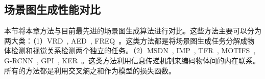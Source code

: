 \begin{table}[htbp]
\begin{center}
\end{center}
\caption{不同多智能体通信步数对性能的影响}
\label{ch4:tab:comm_steps}
\end{table}



\subsection{场景图生成性能对比}
本节将本章方法与目前最先进的场景图生成算法进行对比。这些方法主要可以分为两大类：（1）VRD~\cite{lu2016visual}, AED~\cite{newell2017pixels}, FREQ~\cite{zellers2018neural}。这类方法都是将场景图生成任务分解成物体检测和视觉关系检测两个独立的任务。（2）MSDN~\cite{li2017scene}, IMP~\cite{xu2017scene}, TFR~\cite{jae2018tensorize}, MOTIFS~\cite{zellers2018neural}, G-RCNN~\cite{yang2018graph}, GPI~\cite{herzig2018mapping}, KER~\cite{chen2019knowledge}。这类方法利用信息传递机制来编码物体间的内在联系。所有的方法都是利用交叉熵之和作为模型的损失函数。


